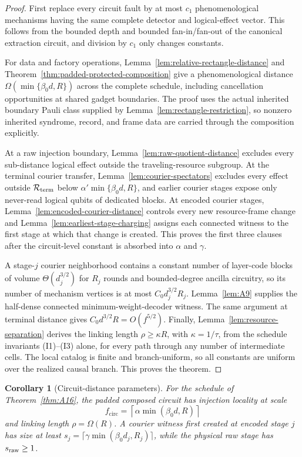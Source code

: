 \documentclass[aps,prx,reprint,superscriptaddress,nofootinbib,floatfix,longbibliography]{revtex4-2}
\newtheorem{corollary}[theorem]{Corollary}
\theoremstyle{definition}
\begin{document}
\begin{proof}
First replace every circuit fault by at most $c_1$ phenomenological mechanisms
having the same complete detector and logical-effect vector.  This follows
from the bounded depth and bounded fan-in/fan-out of the canonical extraction
circuit, and division by $c_1$ only changes constants.

For data and factory operations, Lemma~\ref{lem:relative-rectangle-distance} and
Theorem~\ref{thm:padded-protected-composition} give a phenomenological distance
$\Omega(\min\{\beta_0d,R\})$ across the complete schedule, including
cancellation opportunities at shared gadget boundaries.  The proof uses the actual inherited boundary Pauli class supplied by Lemma~\ref{lem:rectangle-restriction}, so nonzero inherited syndrome, record, and frame data are carried through the composition explicitly.

At a raw injection boundary, Lemma~\ref{lem:raw-quotient-distance} excludes every
sub-distance logical effect outside the traveling-resource subgroup.  At the
terminal courier transfer, Lemma~\ref{lem:courier-spectators} excludes every
effect outside $\mathcal R_{\rm term}$ below $\alpha'\min\{\beta_0d,R\}$,
and earlier courier stages expose only never-read logical qubits of dedicated
blocks.  At
encoded courier stages, Lemma~\ref{lem:encoded-courier-distance} controls every new
resource-frame change and Lemma~\ref{lem:earliest-stage-charging} assigns each
connected witness to the first stage at which that change is created.  This
proves the first three clauses after the circuit-level constant is absorbed
into $\alpha$ and $\gamma$.

A stage-$j$ courier neighborhood contains a constant number of layer-code
blocks of volume $\Theta(d_j^{3/2})$ for $R_j$ rounds and bounded-degree
ancilla circuitry, so its number of mechanism vertices is at most
$C_0d_j^{3/2}R_j$.  Lemma~\ref{lem:A9} supplies the half-dense connected
minimum-weight-decoder witness.  The same argument at terminal distance gives
$C_0d^{3/2}R=O(f^{5/2})$.  Finally, Lemma~\ref{lem:resource-separation}
derives the linking length $\rho\geq\kappa R$, with $\kappa=1/\tau$, from the
schedule invariants (I1)--(I3) alone, for every path through any number of
intermediate cells.  The local
catalog is finite and branch-uniform, so all constants are uniform over the
realized causal branch.  This proves the theorem.
\end{proof}

\begin{corollary}[Circuit-distance parameters]\label{thm:A17}
For the schedule of Theorem~\ref{thm:A16}, the padded composed circuit has
injection locality at scale
\begin{equation}
 f_{\mathrm{circ}}=\left\lceil\alpha\min(\beta_0d,R)\right\rceil    \tag{A18}
\end{equation}
and linking length $\rho=\Omega(R)$.  A courier witness first created at
encoded stage $j$ has size at least
$s_j=\lceil\gamma\min(\beta_0d_j,R_j)\rceil$, while the physical raw stage has
$s_{\rm raw}\geq1$.
\end{corollary}
\end{document}
